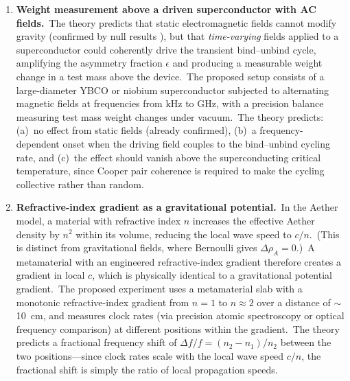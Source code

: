 ﻿\documentclass[12pt,letterpaper]{article}
\newcommand{\rhoa}{\rho_{\!A}}
\begin{document}
\begin{enumerate}[leftmargin=2em]
  \item \textbf{Weight measurement above a driven superconductor with AC fields.}\
    The theory predicts that static electromagnetic fields cannot modify gravity
    (confirmed by null results \cite{hathaway2021,tajmar2024}), but that
    \emph{time-varying} fields applied to a superconductor could coherently
    drive the transient bind--unbind cycle, amplifying the asymmetry fraction
    $\epsilon$ and producing a measurable weight change in a test mass above the
    device.\ The proposed setup consists of a large-diameter YBCO or niobium
    superconductor subjected to alternating magnetic fields at frequencies from
    kHz to GHz, with a precision balance measuring test mass weight changes under
    vacuum.\ The theory predicts: (a)~no effect from static fields (already confirmed),
    (b)~a frequency-dependent onset when the driving field couples to the
    bind--unbind cycling rate, and (c)~the effect should vanish above the
    superconducting critical temperature, since Cooper pair coherence is
    required to make the cycling collective rather than random.

  \item \textbf{Refractive-index gradient as a gravitational potential.}\
    In the Aether model, a material with refractive index $n$ increases the
    effective Aether density by $n^2$ within its volume, reducing the local
    wave speed to $c/n$.\ (This is distinct from gravitational fields, where
    Bernoulli gives $\Delta\rhoa = 0$.)\ A metamaterial with
    an engineered refractive-index gradient therefore creates a gradient in
    local $c$, which is physically identical to a gravitational potential
    gradient.\ The proposed experiment uses a metamaterial slab with a
    monotonic refractive-index gradient from $n = 1$ to $n \approx 2$ over
    a distance of $\sim$10~cm, and measures clock rates (via precision
    atomic spectroscopy or optical frequency comparison) at different
    positions within the gradient.\ The theory predicts a fractional frequency
    shift of $\Delta f / f = (n_2 - n_1)/n_2$ between the two
    positions---since clock rates scale with the local wave speed
    $c/n$, the fractional shift is simply the ratio of local
    propagation speeds.


\end{enumerate}
\end{document}
